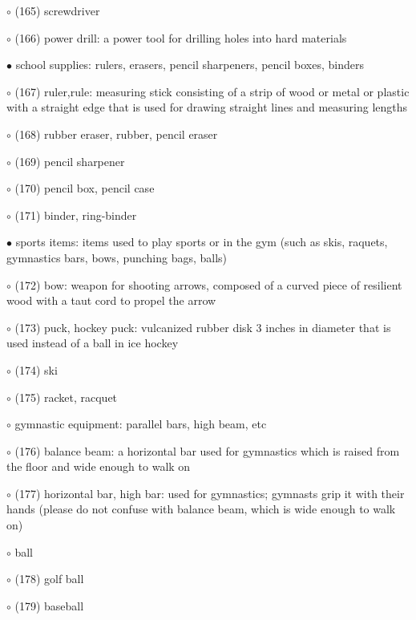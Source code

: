 \noindent \leftskip=0.25cm $\circ$ (165) screwdriver

\noindent \leftskip=0.25cm $\circ$ (166) power drill: a  power tool for drilling holes into hard materials

\noindent \leftskip=0.0cm $\bullet$ school supplies: rulers, erasers, pencil sharpeners, pencil boxes, binders

\noindent \leftskip=0.25cm $\circ$ (167) ruler,rule: measuring stick consisting of a strip of wood or metal or plastic with a straight edge that is used for drawing straight lines and measuring lengths

\noindent \leftskip=0.25cm $\circ$ (168) rubber eraser, rubber, pencil eraser

\noindent \leftskip=0.25cm $\circ$ (169) pencil sharpener

\noindent \leftskip=0.25cm $\circ$ (170) pencil box, pencil case

\noindent \leftskip=0.25cm $\circ$ (171) binder, ring-binder

\noindent \leftskip=0.0cm $\bullet$ sports items: items used to play sports or in the gym (such as skis, raquets, gymnastics bars, bows, punching bags, balls)

\noindent \leftskip=0.25cm $\circ$ (172) bow: weapon for shooting arrows, composed of a curved piece of resilient wood with a taut cord to propel the arrow

\noindent \leftskip=0.25cm $\circ$ (173) puck, hockey puck: vulcanized rubber disk 3 inches in diameter that is used instead of a ball in ice hockey

\noindent \leftskip=0.25cm $\circ$ (174) ski

\noindent \leftskip=0.25cm $\circ$ (175) racket, racquet

\noindent \leftskip=0.25cm $\circ$ gymnastic equipment: parallel bars, high beam, etc

\noindent \leftskip=0.5cm $\circ$ (176) balance beam: a horizontal bar used for gymnastics which is raised from the floor and wide enough to walk on

\noindent \leftskip=0.5cm $\circ$ (177) horizontal bar, high bar: used for gymnastics; gymnasts grip it with their hands (please do not confuse with balance beam, which is wide enough to walk on)

\noindent \leftskip=0.25cm $\circ$ ball

\noindent \leftskip=0.5cm $\circ$ (178) golf ball

\noindent \leftskip=0.5cm $\circ$ (179) baseball

